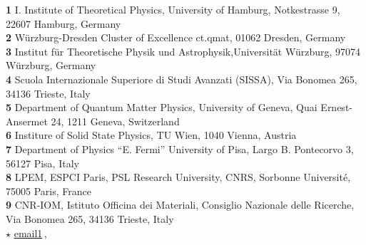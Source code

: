 \documentclass[dvipsnames]{SciPost}
\begin{document}
\begin{center}
  \newcommand{\CNRIOM}{CNR-IOM, Istituto Officina dei Materiali,
  Consiglio Nazionale delle Ricerche, Via Bonomea 265, 34136
  Trieste, Italy}
\newcommand{\SISSA}{Scuola Internazionale Superiore di Studi Avanzati (SISSA),
  Via Bonomea 265, 34136 Trieste, Italy}
\newcommand{\ITPHamburg}{I. Institute of Theoretical Physics,
  University of Hamburg, Notkestrasse 9, 22607 Hamburg, Germany}
\newcommand{\WZBURG}{Institut f\"ur Theoretische Physik und
  Astrophysik,Universit\"at W\"urzburg, 97074 W\"urzburg, Germany}
\newcommand{\CTQMAT}{W\"urzburg-Dresden Cluster of Excellence ct.qmat, 01062 Dresden, Germany}
\newcommand{\Geneve}{Department of Quantum Matter Physics, University of
  Geneva, Quai Ernest-Ansermet 24, 1211 Geneva, Switzerland}
\newcommand{\UPISA}{Department of Physics ``E. Fermi'' University of
  Pisa, Largo B. Pontecorvo 3, 56127 Pisa, Italy}
\newcommand{\ESPCI}{LPEM, ESPCI Paris, PSL Research University, CNRS, Sorbonne Universit\'e, 75005 Paris, France}
\newcommand{\TUW}{Institure of Solid State Physics, TU Wien, 1040 Vienna, Austria}

{\bf 1} \ITPHamburg\\
{\bf 2} \CTQMAT\\
{\bf 3} \WZBURG\\
{\bf 4} \SISSA\\
{\bf 5} \Geneve\\
{\bf 6} \TUW\\   
{\bf 7} \UPISA\\
{\bf 8} \ESPCI\\
{\bf 9} \CNRIOM\\
\vspace{\baselineskip}
$\star$ \href{mailto:email1}{\small email1}\,,\quad
\end{center}

\section*{\color{scipostdeepblue}{Abstract}}
\textbf{}
\end{document}
